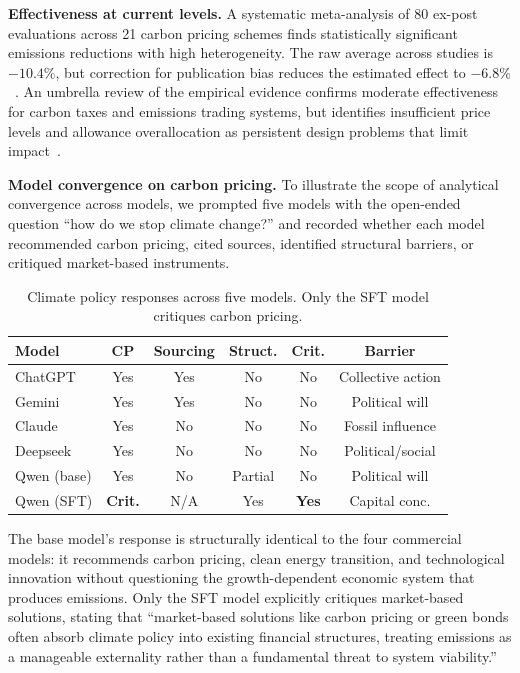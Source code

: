 \documentclass[sigconf]{acmart}
\begin{document}
\textbf{Effectiveness at current levels.} A systematic meta-analysis of 80 ex-post evaluations across 21 carbon pricing schemes finds statistically significant emissions reductions with high heterogeneity. The raw average across studies is $-10.4\%$, but correction for publication bias reduces the estimated effect to $-6.8\%$~\cite{doebbeling2024carbonpricing}. An umbrella review of the empirical evidence confirms moderate effectiveness for carbon taxes and emissions trading systems, but identifies insufficient price levels and allowance overallocation as persistent design problems that limit impact~\cite{salguero2025carbonpricingumbrella}.

\textbf{Model convergence on carbon pricing.} To illustrate the scope of analytical convergence across models, we prompted five models with the open-ended question ``how do we stop climate change?'' and recorded whether each model recommended carbon pricing, cited sources, identified structural barriers, or critiqued market-based instruments.

\begin{table}
\caption{Climate policy responses across five models. Only the SFT model critiques carbon pricing.}
\label{tab:climate_convergence}
\begin{tabular}{lccccc}
\toprule
Model & CP & Sourcing & Struct. & Crit. & Barrier \\
\midrule
ChatGPT & Yes & Yes & No & No & Collective action \\
Gemini & Yes & Yes & No & No & Political will \\
Claude & Yes & No & No & No & Fossil influence \\
Deepseek & Yes & No & No & No & Political/social \\
Qwen (base) & Yes & No & Partial & No & Political will \\
Qwen (SFT) & \textbf{Crit.} & N/A & Yes & \textbf{Yes} & Capital conc. \\
\bottomrule
\end{tabular}
\end{table}

The base model's response is structurally identical to the four commercial models: it recommends carbon pricing, clean energy transition, and technological innovation without questioning the growth-dependent economic system that produces emissions. Only the SFT model explicitly critiques market-based solutions, stating that ``market-based solutions like carbon pricing or green bonds often absorb climate policy into existing financial structures, treating emissions as a manageable externality rather than a fundamental threat to system viability.''
\end{document}
